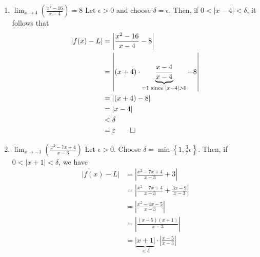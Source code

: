 \documentclass{article}
\begin{document}
\begin{enumerate}
  You can confirm the upper bounds with this Desmos calculator: \url{https://www.desmos.com/calculator/zyaxx5fihr}. \newline
  
  Without Desmos, note that the function $g(x)=(x+3)(x-1)$ is continuous, and so it attains a maximum on the closed interval $[1,3]$ (which is the interval of $x$ values that satisfy $\left|x-2\right|<1$). The maximum occurs at one of the endpoints, and so we can check $g(1)=4$ and $g(3)=12$, which confirms our upper bound of $12$.

  Then, 
  \[
    \left| f(x) - L \right| = \ldots = \left|x-2\right| \cdot \left|x+3\right| \cdot \left|x-1\right| 
    < \delta \cdot 6 \cdot 2 = 12 \, \delta = 12\cdot \frac{\epsilon}{12} = \epsilon \qed
  \]
  \color{black}

  \item $\lim_{x \to 4} \left( \frac{x^2 - 16}{x-4} \right)= 8$
  \newline\color{blue}
  Let $\epsilon>0$ and choose $\delta = \epsilon$. Then, if $0 < \left| x-4 \right| < \delta$, it follows that
  \begin{align*}
    \left| f(x) - L \right| &= \left| \frac{x^2 - 16}{x-4} - 8 \right| \\
    &= \left| (x+4)\cdot\underbrace{\frac{x-4}{x-4}}_{=1 \textrm{ since } |x-4|>0} - 8 \right| \\
    &= \left| (x+4) - 8\right| \\
    &= \left| x-4 \right| \\
    &< \delta \\
    &=\epsilon \qed
  \end{align*}
  
  \item $\lim_{x \to -1} \left( \frac{x^{2}-7x+4}{x-3} \right)$
  \newline\color{blue}
  Let $\epsilon > 0$. Choose $\delta = \min\left\{1, \frac{3}{7}\epsilon\right\}$. Then, if $0 < |x + 1| < \delta$, we have
  \begin{align*}
    \left| f(x) - L \right| &= \left| \frac{x^2-7x+4}{x-3} + 3 \right| \\
    &= \left| \frac{x^2-7x+4}{x-3} + \frac{3x-9}{x-3} \right|  \\
    &= \left| \frac{x^2-4x-5}{x-3} \right| \\
    &= \left| \frac{(x-5)(x+1)}{x-3} \right| \\
    &= \underbrace{\left|x+1\right|}_{< \delta} \cdot \left| \frac{x-5}{x-3} \right| \\
  \end{align*}


\end{enumerate}
\end{document}
